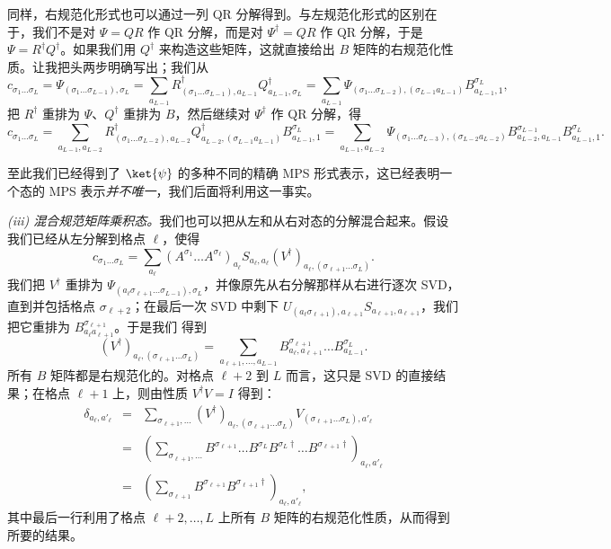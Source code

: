 同样，右规范化形式也可以通过一列 QR 分解得到。与左规范化形式的区别在于，我们不是对 $\Psi=QR$ 作 QR 分解，而是对 $\Psi^\dagger=QR$ 作 QR 分解，于是 $\Psi = R^\dagger Q^\dagger$。如果我们用 $Q^\dagger$ 来构造这些矩阵，这就直接给出 $B$ 矩阵的右规范化性质。让我把头两步明确写出；我们从
\begin{equation}
c_{\sigma_1\ldots\sigma_L} = \Psi_{(\sigma_1\ldots\sigma_{L-1}),\sigma_L} =
\sum_{a_{L-1}} R^\dagger_{(\sigma_1\ldots\sigma_{L-1}),a_{L-1}} Q^\dagger_{a_{L-1},\sigma_L} =
\sum_{a_{L-1}} \Psi_{(\sigma_1\ldots\sigma_{L-2}),(\sigma_{L-1}a_{L-1})} B^{\sigma_L}_{a_{L-1},1},
\end{equation}
把 $R^\dagger$ 重排为 $\Psi$、$Q^\dagger$ 重排为 $B$，然后继续对 $\Psi^\dagger$ 作 QR 分解，得
\begin{equation}
c_{\sigma_1\ldots\sigma_L} = \sum_{a_{L-1},a_{L-2}} R^\dagger_{(\sigma_1\ldots\sigma_{L-2}),a_{L-2}} Q^\dagger_{a_{L-2},(\sigma_{L-1}a_{L-1})}  B^{\sigma_L}_{a_{L-1},1} 
= \sum_{a_{L-1},a_{L-2}} \Psi_{(\sigma_1\ldots\sigma_{L-3}),(\sigma_{L-2}a_{L-2})}
B^{\sigma_{L-1}}_{a_{L-2},a_{L-1}} B^{\sigma_L}_{a_{L-1},1} .
\end{equation}

至此我们已经得到了 $\ket{\psi}$ 的多种不同的精确 MPS 形式表示，这已经表明一个态的 MPS 表示{\em 并不唯一}，我们后面将利用这一事实。

{\em (iii) 混合规范矩阵乘积态。}我们也可以把从左和从右对态的分解混合起来。假设我们已经从左分解到格点 $\ell$，使得
\begin{equation}
c_{\sigma_1\ldots\sigma_L} = \sum_{a_\ell} (A^{\sigma_1} \ldots A^{\sigma_\ell})_{a_\ell} S_{a_\ell,a_\ell} (V^\dagger)_{a_\ell, (\sigma_{\ell+1} \ldots \sigma_L)} .
\end{equation}
我们把 $V^\dagger$ 重排为 $\Psi_{(a_\ell \sigma_{\ell+1} \ldots \sigma_{L-1}), \sigma_L}$，并像原先从右分解那样从右进行逐次 SVD，直到并包括格点 $\sigma_{\ell+2}$；在最后一次 SVD 中剩下 $U_{(a_{\ell}\sigma_{\ell+1}),a_{\ell+1}} S_{a_{\ell+1},a_{\ell+1}}$，我们把它重排为 $B^{\sigma_{\ell+1}}_{a_{\ell}a_{\ell+1}}$。于是我们
得到
\begin{equation}
(V^\dagger)_{a_\ell, (\sigma_{\ell+1} \ldots \sigma_L)} = \sum_{a_{\ell+1},\ldots,a_{L-1}} B^{\sigma_{\ell+1}}_{a_\ell, a_{\ell+1}} \ldots B^{\sigma_L}_{a_{L-1}} .
\end{equation}
所有 $B$ 矩阵都是右规范化的。对格点 $\ell+2$ 到 $L$ 而言，这只是 SVD 的直接结果；在格点 $\ell+1$ 上，则由性质 $V^\dagger V = I$ 得到：
\begin{eqnarray*}
\delta_{a_\ell,a'_\ell} &=&
\sum_{\sigma_{\ell+1},\ldots} (V^\dagger)_{a_\ell, (\sigma_{\ell+1} \ldots \sigma_L)} V_{( \sigma_{\ell+1} \ldots \sigma_L),a'_\ell} \\
&=& ( \sum_{\sigma_{\ell+1},\ldots} B^{\sigma_{\ell+1}} \ldots B^{\sigma_L} B^{\sigma_L\dagger} \ldots B^{\sigma_{\ell+1}\dagger} )_{a_\ell,a'_\ell} \\
&=& ( \sum_{\sigma_{\ell+1}} B^{\sigma_{\ell+1}} B^{\sigma_{\ell+1}\dagger} )_{a_\ell,a'_\ell} ,
\end{eqnarray*}
其中最后一行利用了格点 $\ell+2,\ldots,L$ 上所有 $B$ 矩阵的右规范化性质，从而得到所要的结果。

